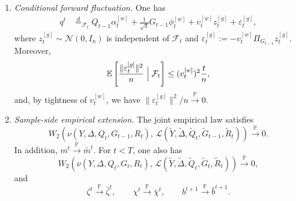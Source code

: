 \begin{proposition}
\begin{description}[wide]
\begin{enumerate}[label=(\roman*),wide]
        \item \emph{Conditional forward fluctuation.}
        One has
        \begin{align}
            q^t
            &\stackrel d=_{\mathcal F_t}
            Q_{t-1}\alpha_t^{[w]}
            +\frac1{\sqrt\delta}G_{t-1}\phi_t^{[w]}
            +v_t^{[w]}z_t^{[g]}
            +\varepsilon_t^{[g]},
            \label{eq:conditional-q-decomposition-lemmas}
        \end{align}
        where $z_t^{[g]}\sim\mathcal N(0,I_n)$ is independent
        of $\mathcal F_t$ and
        \(
            \varepsilon_t^{[g]}
            :=
            -v_t^{[w]}\Pi_{G_{t-1}}z_t^{[g]}
        \).
        Moreover,
        \begin{equation}
            \mathbb E\left[
                \frac{\|\varepsilon_t^{[g]}\|^2}{n}
                \Bigm|\mathcal F_t
            \right]
            \leq
            (v_t^{[w]})^2\frac tn,
            \label{eq:forward-projection-error-lemmas}
        \end{equation}
        and, by tightness of $v_t^{[w]}$, we have
        \(
            \|\varepsilon_t^{[g]}\|^2 / n
            \xrightarrow{\mathbb P}0
        \).

        \item \emph{Sample-side empirical extension.}
        The joint empirical law satisfies
        \begin{equation}
            W_2 \left(
            \nu(Y,\Delta,Q_t,G_{t-1},R_t)
            , \,  
            \mathscr L(
                \tilde Y,\tilde\Delta,
                \tilde Q_t,\tilde G_{t-1},\tilde R_t
                )
            \right)
            \xrightarrow{\mathbb P}
            0.
            \label{eq:master-forward-empirical-law}
        \end{equation}
        In addition,
        \(
            m^t\xrightarrow{\mathbb P}\bar m^t
        \).
        For $t<T$, one also has
        \begin{equation}
            W_2 \left(
            \nu{(Y,\Delta,Q_t,G_t,R_t)}
            , \,
            \mathscr L(
                \tilde Y,\tilde\Delta,
                \tilde Q_t,\tilde G_t,\tilde R_t
            )
            \right)
            \xrightarrow{\mathbb P}
            0
            ,
            \label{eq:master-forward-residual-extension}
        \end{equation}
        and
        \begin{equation}
            \zeta^t\xrightarrow{\mathbb P}\bar\zeta^t,
            \qquad
            \chi^t\xrightarrow{\mathbb P}\bar\chi^t,
            \qquad
            b^{t+1}\xrightarrow{\mathbb P}\bar b^{t+1}.
            \label{eq:master-backward-macroscopic-convergence}
        \end{equation}
    \end{enumerate}


\end{description}
\end{proposition}
